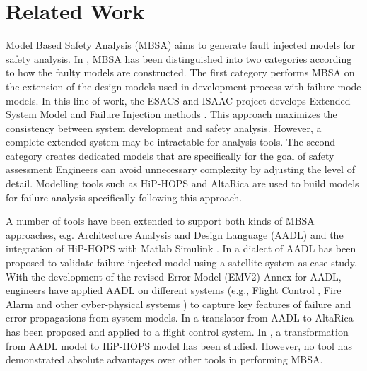 
\section{Related Work}

Model Based Safety Analysis (MBSA) \cite{mbsa05} aims to generate fault injected models for safety analysis. 
 In \cite{mbsa11}, MBSA has been distinguished into two categories according to how the faulty models are constructed.
 The first category performs MBSA on the extension of the design models used in development process with failure mode models.
 In this line of work, the ESACS and ISAAC project develops Extended System Model and Failure Injection methods \cite{erts06,esrel03}. 
 This approach maximizes the consistency between system development and safety analysis. 
 However, a complete extended system may be intractable for analysis tools. 
 The second category creates dedicated models that are specifically for the goal of safety assessment
 Engineers can avoid unnecessary complexity by adjusting the level of detail. 
 Modelling tools such as HiP-HOPS and AltaRica are used to build models for failure analysis specifically following this approach. 

A number of tools have been extended to support both kinds of MBSA approaches, 
 e.g. Architecture Analysis and Design Language (AADL) \cite{cmu07,sae11} 
 and the integration of HiP-HOPS with Matlab Simulink \cite{dsn01}. 
%
 In \cite{aadl13} a dialect of AADL has been proposed to validate failure injected model using a satellite system as case study. 
 With the development of the revised Error Model (EMV2) Annex \cite{aadlemv2} for AADL, 
 engineers have applied AADL on different systems (e.g., Flight Control \cite{field1}, Fire Alarm \cite{field2} and other cyber-physical systems \cite{field3}) 
 to capture key features of failure and error propagations from system models. 
%
 In \cite{aadl_altarica} a translator from AADL to AltaRica has been proposed and applied to a flight control system.
 In \cite{aadl_hiphop}, a transformation from AADL model to HiP-HOPS model has been studied. 
 However, no tool has demonstrated absolute advantages over other tools in performing MBSA.
